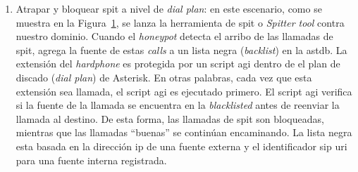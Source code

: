 \documentclass[a4paper,12pt]{report}
\begin{document}
\begin{itemize}
\begin{enumerate}
Así también, SVCRACK es un script
provisto en la \emph{suite} SIPVicious que puede quebrar (inhibir) la herramienta
atacante. Se hace uso de este script del lado del \emph{honeypot} cuando se detecta la
herramienta SIPVicious. Este puede mostrarse en la siguiente regla:  

\begin{verbatim}
[rule_sip_vicious]
type = classification
context = INVITE
pre-action = assign %a Check_Fingerprint()
condition= %a == "SIPVicious"                                     
action = system ’python /sipvicious/svcrash.py \
-d SipMsg.Contact.Ip \                                         
-p SipMsg.Contact.Port’
\end{verbatim}

\begin{figure}[h!] 
\centering
\texttt{[image: /home/delivery/Desktop/ArtemisaLatex1/Figuras/Fig2i.jpg]}
\caption{La cama de prueba (\emph{testbed}). \cite{docarmof}}
\label{cama_de_prueba}
\end{figure}


\item Atrapar y bloquear \ac{spit} a nivel de \emph{dial plan}:
en este escenario, como se muestra en la Figura~\ref{cama_de_prueba}, se lanza la herramienta de \ac{spit}
o \emph{Spitter tool} contra nuestro dominio. Cuando el 
\emph{honeypot} detecta el arribo de las llamadas de \ac{spit}, agrega
la fuente de estas \emph{calls} a un lista negra (\emph{backlist}) en la \ac{astdb}.
La extensión del \emph{hardphone} es
protegida por un script \ac{agi} dentro de el
plan de discado (\emph{dial plan}) de Asterisk. En otras pa\-la\-bras, cada vez que esta
extensión sea llamada, el script \ac{agi} es ejecutado primero. El script \ac{agi}
verifica si la fuente de la llamada se encuentra en la \emph{blacklisted} 
antes de reenviar la llamada al destino. De esta forma,
las llamadas de \ac{spit} son bloqueadas, mientras que las llamadas ``buenas'' se
continúan encaminando. La lista negra esta basada en la dirección \ac{ip} de una
fuente externa y el identificador \ac{sip} \ac{uri} para una fuente interna
registrada. 
         

\end{enumerate}
\end{itemize}
\end{document}
